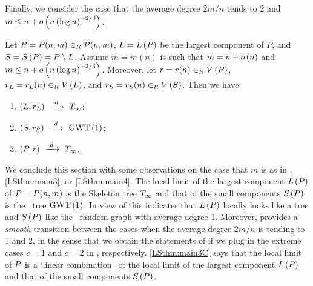 Finally, we consider the case that the average degree $2m/n$ tends to 2 and $m\leq n+o\left(n\left(\log n\right)^{-2/3}\right)$.
\begin{thm}\label{LSthm:main4}
	Let $P=P(n,m)\in_R\mathcal{P}(n,m)$, $L=L\left(P\right)$ be the largest component of $P$, and $S=S\left(P\right)=P\setminus L$. Assume $m=m(n)$ is such that $m=n+o\left(n\right)$ and $m\leq n+o\left(n\left(\log n\right)^{-2/3}\right)$. Moreover, let $r=r(n)\in_RV\left(P\right)$, $r_L=r_L(n)\in_RV\left(L\right)$, and $r_S=r_S(n)\in_RV\left(S\right)$. Then we have
	\begin{enumerate}[label=\normalfont(\roman*)]
		\item $\left(L, r_L\right)~\xrightarrow{~d~}~T_\infty$;
		\item
		$\left(S, r_S\right)~\xrightarrow{~d~}~\operatorname{GWT}\left(1\right)$;
		\item
		$\left(P, r\right)~\xrightarrow{~d~}~T_\infty$.
	\end{enumerate}
\end{thm}
We conclude this section with some observations on the case that $m$ is as in , \ref{LSthm:main3}, or \ref{LSthm:main4}. The local limit of the largest component $L\left(P\right)$ of $P=P(n,m)$ is the Skeleton tree $T_\infty$ and that of the small components $S\left(P\right)$ is the \GW\ tree $\operatorname{GWT}\left(1\right)$. In view of  this indicates that $L\left(P\right)$ locally looks like a tree and $S\left(P\right)$ like the \ER\ random graph with average degree 1. Moreover,  provides a {\em smooth} transition between the cases when the average degree $2m/n$ is tending to 1 and 2, in the sense that we obtain the statements of  if we plug in the extreme cases $c=1$ and $c=2$ in , respectively. \ref{LSthm:main3C} says that the local limit of $P$ is a \lq linear combination\rq\ of the local limit of the largest component $L\left(P\right)$ and that of the small components $S\left(P\right)$. 

